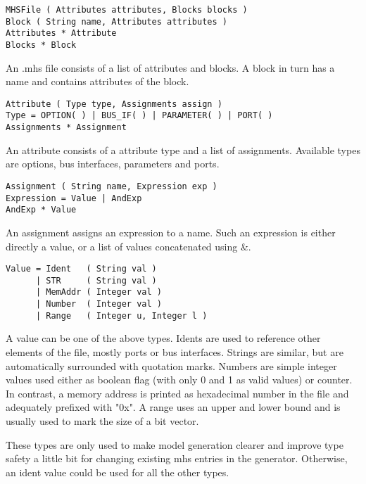 \documentclass{report}
\begin{document}
\begin{lstlisting}
MHSFile ( Attributes attributes, Blocks blocks )
Block ( String name, Attributes attributes )
Attributes * Attribute
Blocks * Block
\end{lstlisting}

An .mhs file consists of a list of attributes and blocks. A block in turn has a name and contains attributes of the block.

\begin{lstlisting}
Attribute ( Type type, Assignments assign )
Type = OPTION( ) | BUS_IF( ) | PARAMETER( ) | PORT( )
Assignments * Assignment
\end{lstlisting}

An attribute consists of a attribute type and a list of assignments. Available types are options, bus interfaces, parameters and ports.

\begin{lstlisting}
Assignment ( String name, Expression exp )
Expression = Value | AndExp
AndExp * Value
\end{lstlisting}

An assignment assigns an expression to a name. Such an expression is either directly a value, or a list of values concatenated using \&. %

\begin{lstlisting}
Value = Ident   ( String val )
      | STR     ( String val )
      | MemAddr ( Integer val )
      | Number  ( Integer val )
      | Range   ( Integer u, Integer l )
\end{lstlisting}

A value can be one of the above types. Idents are used to reference other elements of the file, mostly ports or bus interfaces. Strings are similar, but are automatically surrounded with quotation marks. Numbers are simple integer values used either as boolean flag (with only 0 and 1 as valid values) or counter. In contrast, a memory address is printed as hexadecimal number in the file and adequately prefixed with "0x". A range uses an upper and lower bound and is usually used to mark the size of a bit vector.

These types are only used to make model generation clearer and improve type safety a little bit for changing existing mhs entries in the generator. Otherwise, an ident value could be used for all the other types.
\end{document}
